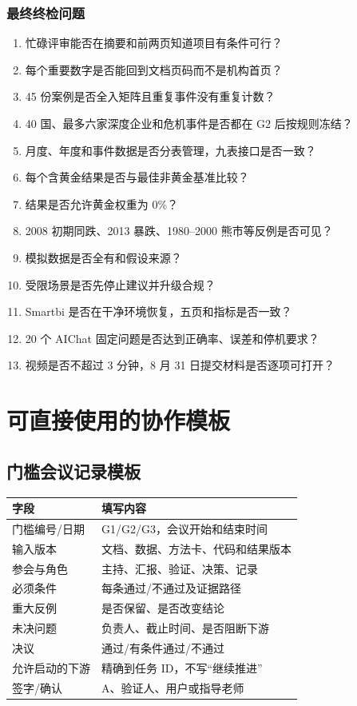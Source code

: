 \documentclass[UTF8,12pt,openany]{ctexbook}
\begin{document}
\section{最终终检问题}
\begin{enumerate}[label=\ensuremath{\square}]
  \item 忙碌评审能否在摘要和前两页知道项目有条件可行？
  \item 每个重要数字是否能回到文档页码而不是机构首页？
  \item 45 份案例是否全入矩阵且重复事件没有重复计数？
  \item 40 国、最多六家深度企业和危机事件是否都在 G2 后按规则冻结？
  \item 月度、年度和事件数据是否分表管理，九表接口是否一致？
  \item 每个含黄金结果是否与最佳非黄金基准比较？
  \item 结果是否允许黄金权重为 0\%？
  \item 2008 初期同跌、2013 暴跌、1980--2000 熊市等反例是否可见？
  \item 模拟数据是否全有和假设来源？
  \item 受限场景是否先停止建议并升级合规？
  \item Smartbi 是否在干净环境恢复，五页和指标是否一致？
  \item 20 个 AIChat 固定问题是否达到正确率、误差和停机要求？
  \item 视频是否不超过 3 分钟，8 月 31 日提交材料是否逐项可打开？
\end{enumerate}

\appendix
\part{可直接使用的协作模板}

\chapter{门槛会议记录模板}
\begin{longtable}{p{3.4cm}p{10.5cm}}
\toprule
\textbf{字段} & \textbf{填写内容}\\
\midrule
门槛编号/日期 & G1/G2/G3，会议开始和结束时间\\
输入版本 & 文档、数据、方法卡、代码和结果版本\\
参会与角色 & 主持、汇报、验证、决策、记录\\
必须条件 & 每条通过/不通过及证据路径\\
重大反例 & 是否保留、是否改变结论\\
未决问题 & 负责人、截止时间、是否阻断下游\\
决议 & 通过/有条件通过/不通过\\
允许启动的下游 & 精确到任务 ID，不写“继续推进”\\
签字/确认 & A、验证人、用户或指导老师\\
\bottomrule
\end{longtable}
\end{document}

